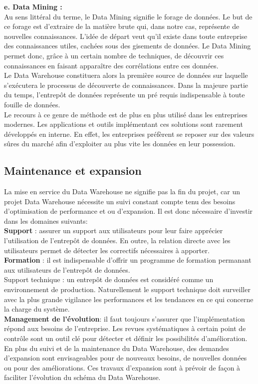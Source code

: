 \textbf{e. Data Mining :}\\
Au sens littéral du terme, le Data Mining signifie le forage de données. Le but de ce forage est d’extraire de la matière brute qui, dans notre cas, représente de nouvelles connaissances. L’idée de départ veut qu’il existe dans toute entreprise des connaissances utiles, cachées sous des gisements de données. Le Data Mining permet donc, grâce à un certain nombre de techniques, de découvrir ces connaissances en faisant apparaître des corrélations entre ces données.\\
Le Data Warehouse constituera alors la première source de données sur laquelle s’exécutera le processus de découverte de connaissances. Dans la majeure partie du temps, l’entrepôt de données représente un pré requis indispensable à toute fouille de données.\\
Le recours à ce genre de méthode est de plus en plus utilisé dans les entreprises modernes. Les applications et outils implémentant ces solutions sont rarement développés en interne. En effet, les entreprises préfèrent se reposer sur des valeurs sûres du marché afin d’exploiter au plus vite les données en leur possession.

 \subsection{Maintenance et expansion}
 La mise en service du Data Warehouse ne signifie pas la fin du projet, car un projet
Data Warehouse nécessite un suivi constant compte tenu des besoins d’optimisation de performance et ou d’expansion. Il est donc nécessaire d’investir dans les domaines suivants:\\
\textbf{Support} : assurer un support aux utilisateurs pour leur faire apprécier l’utilisation de l’entrepôt de données. En outre, la relation directe avec les utilisateurs permet de détecter les  correctifs nécessaires à apporter.\\
\textbf{Formation} : il est indispensable d’offrir un programme de formation permanant aux utilisateurs de l’entrepôt de données.\\
Support technique : un entrepôt de données est considéré comme un environnement de production. Naturellement le support technique doit surveiller avec la plus grande vigilance les performances et les tendances en ce qui concerne la charge du système.\\
\textbf{Management de l’évolution}: il faut toujours s’assurer que l’implémentation répond aux besoins de l’entreprise. Les revues systématiques à certain point de contrôle sont un outil clé pour détecter et définir les possibilités d’amélioration. En plus du suivi et de la maintenance du Data Warehouse, des demandes d’expansion sont envisageables pour de nouveaux besoins, de nouvelles données ou pour des améliorations.
Ces travaux d’expansion sont à prévoir de façon à faciliter l’évolution du schéma du
Data Warehouse.




